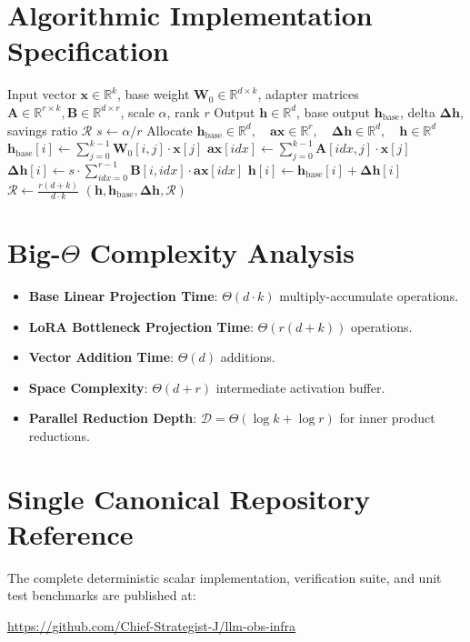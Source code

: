 \documentclass[11pt,a4paper]{article}
\theoremstyle{definition}
\begin{document}
\section{Algorithmic Implementation Specification}

\begin{algorithm}[H]
\caption{LoRA Forward Projection and Savings Accounting}
\begin{algorithmic}[1]
\Require Input vector $\mathbf{x} \in \mathbb{R}^k$, base weight $\mathbf{W}_0 \in \mathbb{R}^{d \times k}$, adapter matrices $\mathbf{A} \in \mathbb{R}^{r \times k}, \mathbf{B} \in \mathbb{R}^{d \times r}$, scale $\alpha$, rank $r$
\Ensure Output $\mathbf{h} \in \mathbb{R}^d$, base output $\mathbf{h}_{\text{base}}$, delta $\mathbf{\Delta h}$, savings ratio $\mathcal{R}$
\State $s \gets \alpha / r$
\State Allocate $\mathbf{h}_{\text{base}} \in \mathbb{R}^d, \quad \mathbf{ax} \in \mathbb{R}^r, \quad \mathbf{\Delta h} \in \mathbb{R}^d, \quad \mathbf{h} \in \mathbb{R}^d$
    \State $\mathbf{h}_{\text{base}}[i] \gets \sum_{j=0}^{k-1} \mathbf{W}_0[i, j] \cdot \mathbf{x}[j]$
\EndFor
{}
    \State $\mathbf{ax}[idx] \gets \sum_{j=0}^{k-1} \mathbf{A}[idx, j] \cdot \mathbf{x}[j]$
\EndFor
{}
    \State $\mathbf{\Delta h}[i] \gets s \cdot \sum_{idx=0}^{r-1} \mathbf{B}[i, idx] \cdot \mathbf{ax}[idx]$
    \State $\mathbf{h}[i] \gets \mathbf{h}_{\text{base}}[i] + \mathbf{\Delta h}[i]$
\EndFor
\State $\mathcal{R} \gets \frac{r(d + k)}{d \cdot k}$
\State \Return $(\mathbf{h}, \mathbf{h}_{\text{base}}, \mathbf{\Delta h}, \mathcal{R})$
\end{algorithmic}
\end{algorithm}

\section{Big-$\Theta$ Complexity Analysis}

\begin{itemize}
    \item \textbf{Base Linear Projection Time}: $\Theta(d \cdot k)$ multiply-accumulate operations.
    \item \textbf{LoRA Bottleneck Projection Time}: $\Theta(r(d + k))$ operations.
    \item \textbf{Vector Addition Time}: $\Theta(d)$ additions.
    \item \textbf{Space Complexity}: $\Theta(d + r)$ intermediate activation buffer.
    \item \textbf{Parallel Reduction Depth}: $\mathcal{D} = \Theta(\log k + \log r)$ for inner product reductions.
\end{itemize}

\section{Single Canonical Repository Reference}

The complete deterministic scalar implementation, verification suite, and unit test benchmarks are published at:
\begin{center}
\url{https://github.com/Chief-Strategist-J/llm-obs-infra}
\end{center}
\end{document}
